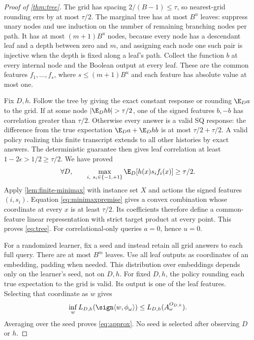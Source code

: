 \begin{proof}[Proof of \cref{thm:tree}]
The grid has spacing $2/(B-1)\leq\tau$, so nearest-grid rounding errs by at most $\tau/2$. The marginal tree has at most $B^u$ leaves: suppress unary nodes and use induction on the number of remaining branching nodes per path. It has at most $(m+1)B^u$ nodes, because every node has a descendant leaf and a depth between zero and $m$, and assigning each node one such pair is injective when the depth is fixed along a leaf's path.
Collect the function $b$ at every internal node and the Boolean output at every leaf. These are the common features $f_1,\ldots,f_s$, where $s\leq(m+1)B^u$ and each feature has absolute value at most one.

Fix $D,h$. Follow the tree by giving the exact constant response or rounding $\E_Da$ to the grid. If at some node $|\E_D hb|>\tau/2$, one of the signed features $b,-b$ has correlation greater than $\tau/2$. Otherwise every answer is a valid SQ response: the difference from the true expectation $\E_Da+\E_D hb$ is at most $\tau/2+\tau/2$. A valid policy realizing this finite transcript extends to all other histories by exact answers. The deterministic guarantee then gives leaf correlation at least $1-2\epsilon>1/2\geq\tau/2$. We have proved
\begin{equation}\label{eq:minimaxpremise}
 \forall D,\qquad \max_{i,\ s_i\in\{-1,+1\}}\E_D[h(x)s_if_i(x)]\geq\tau/2.
\end{equation}
Apply \cref{lem:finite-minimax} with instance set $X$ and actions the signed features $(i,s_i)$. Equation \eqref{eq:minimaxpremise} gives a convex combination whose coordinate at every $x$ is at least $\tau/2$. Its coefficients therefore define a common-feature linear representation with strict target product at every point. This proves \eqref{eq:tree}. For correlational-only queries $a=0$, hence $u=0$.

For a randomized learner, fix a seed and instead retain all grid answers to each full query. There are at most $B^m$ leaves. Use all leaf outputs as coordinates of an embedding, padding when needed. This distribution over embeddings depends only on the learner's seed, not on $D,h$. For fixed $D,h$, the policy rounding each true expectation to the grid is valid. Its output is one of the leaf features. Selecting that coordinate as $w$ gives
\[
 \inf_w L_{D,h}(\sign\langle w,\phi_\omega\rangle)
 \leq L_{D,h}(A_\omega^{O_{D,h}}).
\]
Averaging over the seed proves \eqref{eq:approx}. No seed is selected after observing $D$ or $h$.
\end{proof}

